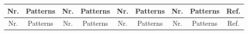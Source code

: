 \documentclass[10pt,a4paper]{article}
\begin{document}
{
\setlength{\LTcapwidth}{\textwidth}
\captionsetup[table]{margin=0pt}
\renewcommand{\arraystretch}{1.85}   
\setlength{\tabcolsep}{5pt}          
\footnotesize
\begin{longtable}{|c c c c c c c c|c|}
\hline
\footnotesize{Nr.} & {\footnotesize Patterns} &
\footnotesize{Nr.} & {\footnotesize Patterns} &
\footnotesize{Nr.} & {\footnotesize Patterns} &
\footnotesize{Nr.} & {\footnotesize Patterns} &
{\footnotesize Ref.} \\
\hline
\hline
\endfirsthead

\hline
\footnotesize{Nr.} & {\footnotesize Patterns} &
\footnotesize{Nr.} & {\footnotesize Patterns} &
\footnotesize{Nr.} & {\footnotesize Patterns} &
\footnotesize{Nr.} & {\footnotesize Patterns} &
{\footnotesize Ref.} \\
\hline
\hline
\endhead


\end{longtable}}
\end{document}
